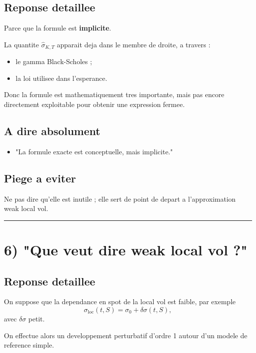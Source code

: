 \documentclass[11pt,a4paper]{article}
\begin{document}
\subsection{Reponse detaillee}

Parce que la formule est \textbf{implicite}.

La quantite \(\hat{\sigma}_{K,T}\) apparait deja dans le membre de droite, a travers :

\begin{itemize}
\item le gamma Black-Scholes ;
\item la loi utilisee dans l'esperance.
\end{itemize}

Donc la formule est mathematiquement tres importante, mais pas encore directement exploitable pour obtenir une expression fermee.

\subsection{A dire absolument}

\begin{itemize}
\item "La formule exacte est conceptuelle, mais implicite."
\end{itemize}

\subsection{Piege a eviter}

Ne pas dire qu'elle est inutile ; elle sert de point de depart a l'approximation weak local vol.

\bigskip\hrule\bigskip

\section{6) "Que veut dire weak local vol ?"}

\subsection{Reponse detaillee}

On suppose que la dependance en spot de la local vol est faible, par exemple
\[
\sigma_{\mathrm{loc}}(t,S)=\sigma_0+\delta\sigma(t,S),
\]
avec \(\delta\sigma\) petit.

On effectue alors un developpement perturbatif d'ordre 1 autour d'un modele de reference simple.
\end{document}
